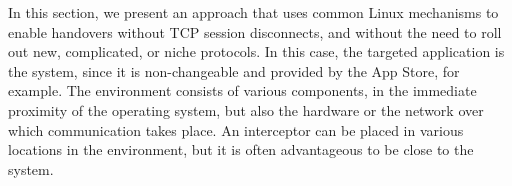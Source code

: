 In this section, we present an approach that uses common Linux mechanisms to enable handovers without TCP session disconnects, and without the need to roll out new, complicated, or niche protocols.
In this case, the targeted application is the system, since it is non-changeable and provided by the App Store, for example.
The environment consists of various components, in the immediate proximity of the operating system, but also the hardware or the network over which communication takes place.
An interceptor can be placed in various locations in the environment, but it is often advantageous to be close to the system. 





